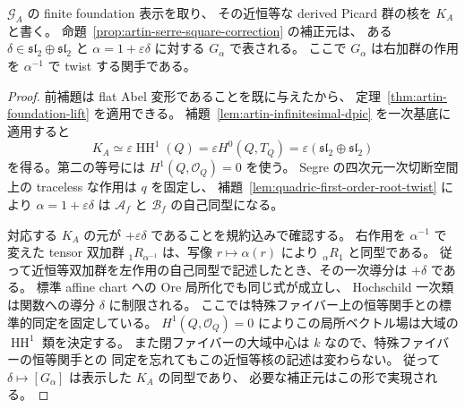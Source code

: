 \begin{lemma}[平方根補正の全近恒等方向は次数付き自己同型から来る]
\label{lem:quadric-first-order-correction-geometric}
$\mathcal G_A$ の finite foundation 表示を取り、
その近恒等な derived Picard 群の核を $K_A$ と書く。
命題~\ref{prop:artin-serre-square-correction} の補正元は、
ある $\delta\in\mathfrak{sl}_2\oplus\mathfrak{sl}_2$ と
$\alpha=1+\varepsilon\delta$ に対する $G_\alpha$ で表される。
ここで $G_\alpha$ は右加群の作用を $\alpha^{-1}$ で twist する関手である。
\end{lemma}
\begin{proof}
前補題は flat Abel 変形であることを既に与えたから、
定理~\ref{thm:artin-foundation-lift} を適用できる。
補題~\ref{lem:artin-infinitesimal-dpic} を一次基底に適用すると
\[
 K_A\simeq\varepsilon\operatorname{HH}^1(Q)
 =\varepsilon H^0(Q,T_Q)
 =\varepsilon(\mathfrak{sl}_2\oplus\mathfrak{sl}_2)
\]
を得る。第二の等号には $H^1(Q,\mathcal O_Q)=0$ を使う。
Segre の四次元一次切断空間上の traceless な作用は $q$ を固定し、
補題~\ref{lem:quadric-first-order-root-twist} により
$\alpha=1+\varepsilon\delta$ は $\mathcal A_f$ と $\mathcal B_f$ の自己同型になる。

対応する $K_A$ の元が $+\varepsilon\delta$ であることを規約込みで確認する。
右作用を $\alpha^{-1}$ で変えた tensor 双加群
${}_1R_{\alpha^{-1}}$ は、写像 $r\mapsto\alpha(r)$ により
${}_\alpha R_1$ と同型である。
従って近恒等双加群を左作用の自己同型で記述したとき、その一次導分は $+\delta$ である。
標準 affine chart への Ore 局所化でも同じ式が成立し、
Hochschild 一次類は関数への導分 $\delta$ に制限される。
ここでは特殊ファイバー上の恒等関手との標準的同定を固定している。
$H^1(Q,\mathcal O_Q)=0$ によりこの局所ベクトル場は大域の
$\operatorname{HH}^1$ 類を決定する。
また閉ファイバーの大域中心は $k$ なので、特殊ファイバーの恒等関手との
同定を忘れてもこの近恒等核の記述は変わらない。
従って $\delta\mapsto[G_\alpha]$ は表示した $K_A$ の同型であり、
必要な補正元はこの形で実現される。
\end{proof}


